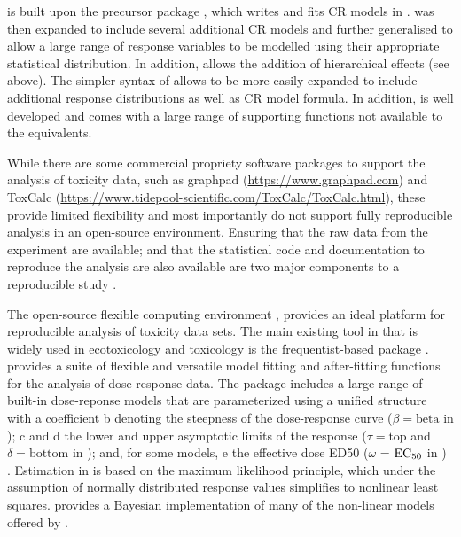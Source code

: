 \documentclass[
  shortnames]{jss}
\begin{document}
 is built upon the precursor  package  \citep{fisher2020}, which writes and fits CR models in  \citep{Plummer2003}.  was then expanded to include several additional CR models and further generalised to allow a large range of response variables to be modelled using their appropriate statistical distribution. In addition,  allows the addition of hierarchical effects (see above). The simpler syntax of  allows  to be more easily expanded to include additional response distributions as well as CR model formula. In addition,  is well developed and comes with a large range of supporting functions not available to the  equivalents.

While there are some commercial propriety software packages to support the analysis of toxicity data, such as graphpad (\url{https://www.graphpad.com}) and ToxCalc (\url{https://www.tidepool-scientific.com/ToxCalc/ToxCalc.html}), these provide limited flexibility and most importantly do not support fully reproducible analysis in an open-source environment. Ensuring that the raw data from the experiment are available; and that the statistical code and documentation to reproduce the analysis are also available are two major components to a reproducible study \citep{peng2015}.

The open-source flexible computing environment , provides an ideal platform for reproducible analysis of toxicity data sets. The main existing tool in  that is widely used in ecotoxicology and toxicology is the frequentist-based package  \citep{Ritz2016}.  provides a suite of flexible and versatile model fitting and after-fitting functions for the analysis of dose-response data. The package includes a large range of built-in dose-reponse models that are parameterized using a unified structure with a coefficient b denoting the steepness of the dose-response curve (\(\beta = \text{beta}\) in ); c and d the lower and upper asymptotic limits of the response (\(\tau = \text{top}\) and \(\delta = \text{bottom}\) in ); and, for some models, e the effective dose ED50 (\(\omega\) = \(\text{EC\textsubscript{50}}\) in ) \citep{Ritz2016}. Estimation in  is based on the maximum likelihood principle, which under the assumption of normally distributed response values simplifies to nonlinear least squares.  provides a Bayesian implementation of many of the non-linear models offered by .
\end{document}
